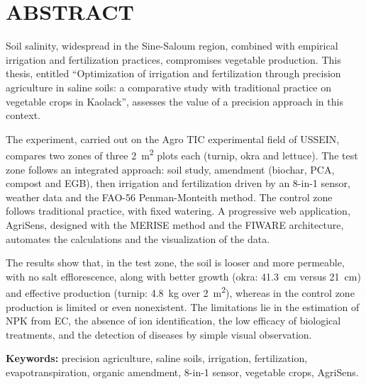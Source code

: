 \chapter*{ABSTRACT}

Soil salinity, widespread in the Sine-Saloum region, combined with empirical irrigation and fertilization practices, compromises vegetable production. This thesis, entitled ``Optimization of irrigation and fertilization through precision agriculture in saline soils: a comparative study with traditional practice on vegetable crops in Kaolack'', assesses the value of a precision approach in this context.

The experiment, carried out on the Agro TIC experimental field of USSEIN, compares two zones of three 2~m\textsuperscript{2} plots each (turnip, okra and lettuce). The test zone follows an integrated approach: soil study, amendment (biochar, PCA, compost and EGB), then irrigation and fertilization driven by an 8-in-1 sensor, weather data and the FAO-56 Penman-Monteith method. The control zone follows traditional practice, with fixed watering. A progressive web application, AgriSens, designed with the MERISE method and the FIWARE architecture, automates the calculations and the visualization of the data.

The results show that, in the test zone, the soil is looser and more permeable, with no salt efflorescence, along with better growth (okra: 41.3~cm versus 21~cm) and effective production (turnip: 4.8~kg over 2~m\textsuperscript{2}), whereas in the control zone production is limited or even nonexistent. The limitations lie in the estimation of NPK from EC, the absence of ion identification, the low efficacy of biological treatments, and the detection of diseases by simple visual observation.

\vspace{1em}
\noindent \textbf{Keywords:} precision agriculture, saline soils, irrigation, fertilization, evapotranspiration, organic amendment, 8-in-1 sensor, vegetable crops, AgriSens.